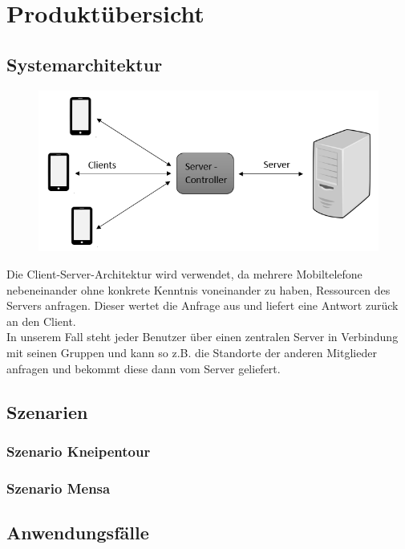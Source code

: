 \section{Produktübersicht}


\subsection{Systemarchitektur}

\begin{figure} [H]
	\centering
	\includegraphics[scale = 0.8]{res/clientServerArchitektur.png}
\end{figure}
Die Client-Server-Architektur wird verwendet, da mehrere Mobiltelefone nebeneinander ohne konkrete Kenntnis voneinander zu haben, Ressourcen des Servers anfragen. Dieser wertet die Anfrage aus und liefert eine Antwort zurück an den Client. \\
In unserem Fall steht jeder Benutzer über einen zentralen Server in Verbindung mit seinen Gruppen und kann so z.B. die Standorte der anderen Mitglieder anfragen und bekommt diese dann vom Server geliefert.

\subsection{Szenarien}
\subsubsection{Szenario Kneipentour}

\subsubsection{Szenario Mensa}

\subsection{Anwendungsfälle}
